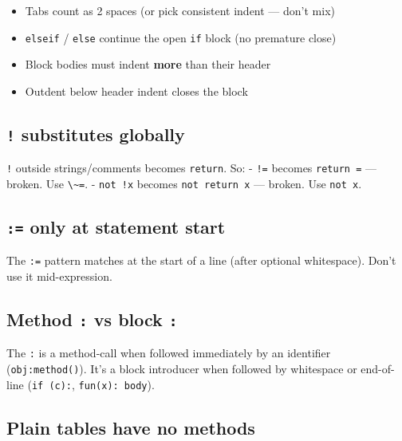 \documentclass[10pt,twocolumn]{article}
\providecommand{\passthrough}[1]{#1}
\providecommand{\tightlist}{\setlength{\itemsep}{0pt}\setlength{\parskip}{0pt}}
\begin{document}
\begin{itemize}
\tightlist
\item
  Tabs count as 2 spaces (or pick consistent indent --- don't mix)
\item
  \passthrough{\lstinline!elseif!} / \passthrough{\lstinline!else!}
  continue the open \passthrough{\lstinline!if!} block (no premature
  close)
\item
  Block bodies must indent \textbf{more} than their header
\item
  Outdent below header indent closes the block
\end{itemize}

\subsection{\texorpdfstring{\texttt{!} substitutes
globally}{! substitutes globally}}\label{substitutes-globally}

\passthrough{\lstinline"!"} outside strings/comments becomes
\passthrough{\lstinline!return!}. So: - \passthrough{\lstinline"!="}
becomes \passthrough{\lstinline!return =!} --- broken. Use
\passthrough{\lstinline!\~=!}. - \passthrough{\lstinline"not !x"}
becomes \passthrough{\lstinline!not return x!} --- broken. Use
\passthrough{\lstinline!not x!}.

\subsection{\texorpdfstring{\texttt{:=} only at statement
start}{:= only at statement start}}\label{only-at-statement-start}

The \passthrough{\lstinline!:=!} pattern matches at the start of a line
(after optional whitespace). Don't use it mid-expression.

\subsection{\texorpdfstring{Method \texttt{:} vs block
\texttt{:}}{Method : vs block :}}\label{method-vs-block}

The \passthrough{\lstinline!:!} is a method-call when followed
immediately by an identifier (\passthrough{\lstinline!obj:method()!}).
It's a block introducer when followed by whitespace or end-of-line
(\passthrough{\lstinline!if (c):!},
\passthrough{\lstinline!fun(x): body!}).

\subsection{Plain tables have no
methods}\label{plain-tables-have-no-methods}
\end{document}

